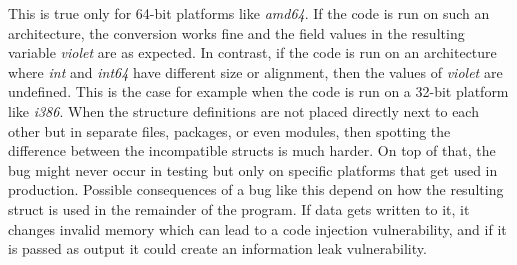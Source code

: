This is true only for 64-bit platforms like \textit{amd64}.
If the code is run on such an architecture, the conversion works fine and the field values in the resulting variable
\textit{violet} are as expected.
In contrast, if the code is run on an architecture where \textit{int} and \textit{int64} have different size or
alignment, then the values of \textit{violet} are undefined.
This is the case for example when the code is run on a 32-bit platform like \textit{i386}.
When the structure definitions are not placed directly next to each other but in separate files, packages, or even
modules, then spotting the difference between the incompatible structs is much harder.
On top of that, the bug might never occur in testing but only on specific platforms that get used in production.
Possible consequences of a bug like this depend on how the resulting struct is used in the remainder of the program.
If data gets written to it, it changes invalid memory which can lead to a code injection vulnerability, and if it is
passed as output it could create an information leak vulnerability.



